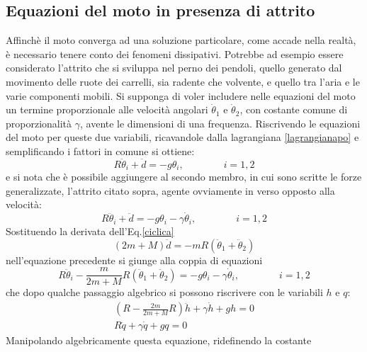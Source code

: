 \documentclass[11pt, a4paper, twoside]{article}
\begin{document}
\subsection{Equazioni del moto in presenza di attrito}
\label{sezioneattrito}
Affinchè il moto converga ad una soluzione particolare, come accade nella realtà, 
è necessario tenere conto dei fenomeni dissipativi.
Potrebbe ad esempio essere considerato l'attrito che si sviluppa nel perno 
dei pendoli, quello generato dal movimento delle ruote dei
 carrelli, sia radente che volvente, e quello tra l'aria e le varie 
 componenti mobili.
Si supponga di voler includere nelle equazioni del moto un termine 
proporzionale alle velocità angolari $\dot \theta_1$ e $\dot \theta_2$, con costante comune di 
proporzionalità $\gamma$, avente le dimensioni di una frequenza. 
Riscrivendo le equazioni del moto 
per queste due variabili, ricavandole dalla lagrangiana \ref{lagrangianapo} e semplificando i fattori in comune
si ottiene:
\begin{equation*}
    R \ddot \theta_i + \ddot d = - g  \theta_i ,\qquad \qquad i =1,2
\end{equation*}
e si nota che è possibile aggiungere al secondo membro, in cui sono scritte le 
forze generalizzate, l'attrito citato sopra, agente ovviamente in verso 
opposto alla velocità:
\begin{equation*}
  R \ddot \theta_i + \ddot d = - g \theta_i  - \gamma   \dot \theta_i,\qquad \qquad i =1,2
\end{equation*}
Sostituendo la derivata dell'Eq.\ref{ciclica}
\begin{equation*}
  (2m + M) \ddot d = -mR (\ddot \theta_1 + \ddot \theta_2) 
\end{equation*} 
nell'equazione precedente si giunge alla coppia di equazioni
\begin{equation*}
  R \ddot \theta_i -\frac{m}{2m + M}R (\ddot \theta_1 + \ddot \theta_2) 
  = - g \theta_i  - \gamma   \dot \theta_i,\qquad \qquad i =1,2
\end{equation*}
che dopo qualche passaggio algebrico si possono riscrivere con le variabili
$h$ e $q$:
\begin{equation*}
  \begin{split}
  (R- \frac{2m}{2m + M}R) \ddot h + \gamma \dot h + g h  = 0 \\
  R \ddot q +\gamma \dot q + g q = 0 
  \end{split}
\end{equation*}
Manipolando algebricamente questa equazione, ridefinendo la costante
\end{document}
